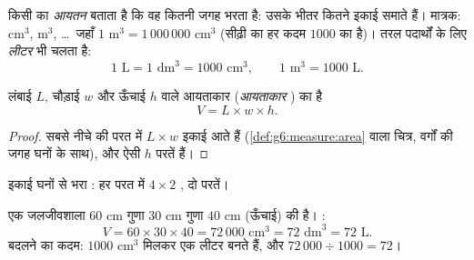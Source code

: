 \begin{definition}[आयतन]\label{def:g6:measure:volume}
किसी  का \emph{आयतन} बताता है कि वह कितनी जगह
भरता है: उसके भीतर कितने इकाई  समाते हैं। मात्रक: cm$^3$,
m$^3$, \dots\ जहाँ $1$ m$^3 = 1\,000\,000$ cm$^3$ (सीढ़ी का हर
कदम $1000$ का है)। तरल पदार्थों के लिए \emph{लीटर} भी चलता है:
\[
1 \text{ L} = 1 \text{ dm}^3 = 1000 \text{ cm}^3,
\qquad
1 \text{ m}^3 = 1000 \text{ L}.
\]
\end{definition}

\begin{proposition}[घनाभ का आयतन]\label{prop:g6:measure:box}
लंबाई $L$, चौड़ाई $w$ और ऊँचाई $h$ वाले आयताकार 
(\emph{आयताकार }) का  है
\[
V = L \times w \times h .
\]
\end{proposition}

\begin{proof}
सबसे नीचे की परत में $L \times w$ इकाई  आते हैं
(\cref{def:g6:measure:area} वाला चित्र, वर्गों की जगह घनों के
साथ), और ऐसी $h$ परतें हैं।
\end{proof}

\begin{omfigure}

{\small इकाई घनों से भरा : हर परत में $4 \times 2$ , दो
परतें।}
\end{omfigure}

\begin{example}\label{ex:g6:measure:aquarium}
एक जलजीवशाला $60$ cm गुणा $30$ cm गुणा $40$ cm (ऊँचाई) की है। :
\[
V = 60 \times 30 \times 40 = 72\,000 \text{ cm}^3 = 72 \text{ dm}^3
= 72 \text{ L}.
\]
बदलने का कदम: $1000$ cm$^3$ मिलकर एक लीटर बनते हैं, और
$72\,000 \div 1000 = 72$।
\end{example}

